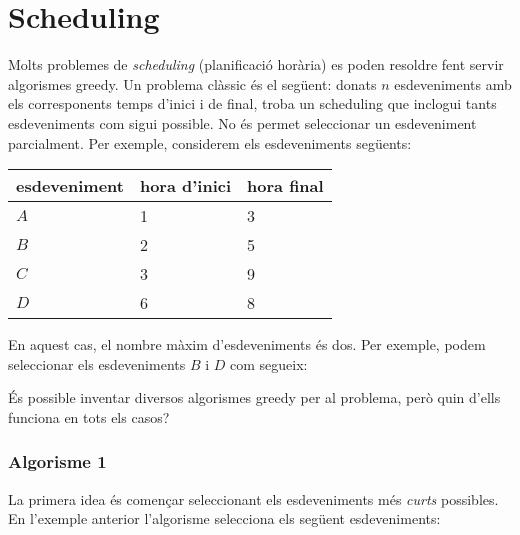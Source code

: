 \section{Scheduling}

Molts problemes de \emph{scheduling} (planificació horària)
es poden resoldre fent servir algorismes greedy.
Un problema clàssic és el següent:
donats $n$ esdeveniments amb els corresponents temps d'inici i
de final, troba un scheduling
que inclogui tants esdeveniments com sigui possible.
No és permet seleccionar un esdeveniment parcialment.
Per exemple, considerem els esdeveniments següents:
\begin{center}
\begin{tabular}{lll}
esdeveniment & hora d'inici & hora final \\
\hline
$A$ & 1 & 3 \\
$B$ & 2 & 5 \\
$C$ & 3 & 9 \\
$D$ & 6 & 8 \\
\end{tabular}
\end{center}
En aquest cas, el nombre màxim d'esdeveniments és dos.
Per exemple, podem seleccionar els esdeveniments $B$ i $D$
com segueix:
\begin{center}
\end{center}

És possible inventar diversos algorismes greedy
per al problema, però quin d'ells funciona en tots els casos?

\subsubsection*{Algorisme 1}

La primera idea és començar seleccionant els
esdeveniments més \emph{curts} possibles.
En l'exemple anterior l'algorisme selecciona els següent
esdeveniments:
\begin{center}
\end{center}

